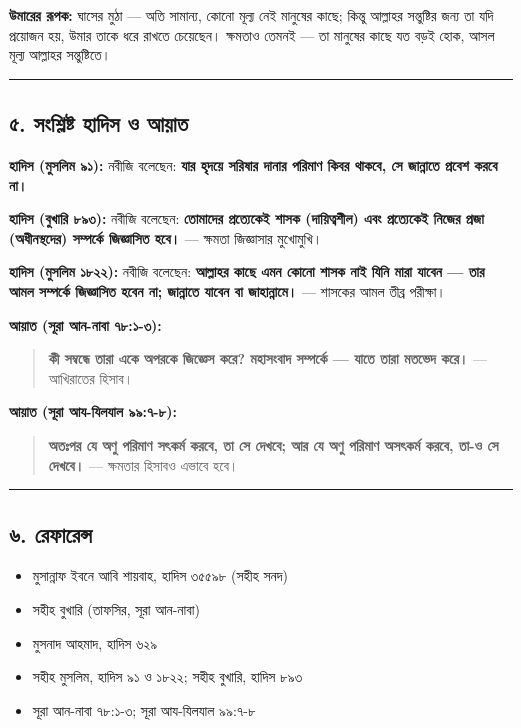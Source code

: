 \textbf{উমারের রূপক:} ঘাসের মুঠা — অতি সামান্য, কোনো মূল্য নেই মানুষের কাছে; কিন্তু আল্লাহর সন্তুষ্টির জন্য তা যদি প্রয়োজন হয়, উমার তাকে ধরে রাখতে চেয়েছেন। ক্ষমতাও তেমনই — তা মানুষের কাছে যত বড়ই হোক, আসল মূল্য আল্লাহর সন্তুষ্টিতে।

\medskip\hrule\medskip

\subsection*{৫. সংশ্লিষ্ট হাদিস ও আয়াত}

\textbf{হাদিস (মুসলিম ৯১):} নবীজি বলেছেন: \textbf{যার হৃদয়ে সরিষার দানার পরিমাণ কিবর থাকবে, সে জান্নাতে প্রবেশ করবে না।}

\textbf{হাদিস (বুখারি ৮৯৩):} নবীজি বলেছেন: \textbf{তোমাদের প্রত্যেকেই শাসক (দায়িত্বশীল) এবং প্রত্যেকেই নিজের প্রজা (অধীনস্থদের) সম্পর্কে জিজ্ঞাসিত হবে।} — ক্ষমতা জিজ্ঞাসার মুখোমুখি।

\textbf{হাদিস (মুসলিম ১৮২২):} নবীজি বলেছেন: \textbf{আল্লাহর কাছে এমন কোনো শাসক নাই যিনি মারা যাবেন — তার আমল সম্পর্কে জিজ্ঞাসিত হবেন না; জান্নাতে যাবেন বা জাহান্নামে।} — শাসকের আমল তীব্র পরীক্ষা।

\textbf{আয়াত (সূরা আন-নাবা ৭৮:১-৩):}
\begin{quote}
\textbf{কী সম্বন্ধে তারা একে অপরকে জিজ্ঞেস করে? মহাসংবাদ সম্পর্কে — যাতে তারা মতভেদ করে।} — আখিরাতের হিসাব।
\end{quote}

\textbf{আয়াত (সূরা আয-যিলযাল ৯৯:৭-৮):}
\begin{quote}
\textbf{অতঃপর যে অণু পরিমাণ সৎকর্ম করবে, তা সে দেখবে; আর যে অণু পরিমাণ অসৎকর্ম করবে, তা-ও সে দেখবে।} — ক্ষমতার হিসাবও এভাবে হবে।
\end{quote}

\medskip\hrule\medskip

\subsection*{৬. রেফারেন্স}

\begin{itemize}
\item মুসান্নাফ ইবনে আবি শায়বাহ, হাদিস ৩৫৫৯৮ (সহীহ সনদ)
\item সহীহ বুখারি (তাফসির, সূরা আন-নাবা)
\item মুসনাদ আহমাদ, হাদিস ৬২৯
\item সহীহ মুসলিম, হাদিস ৯১ ও ১৮২২; সহীহ বুখারি, হাদিস ৮৯৩
\item সূরা আন-নাবা ৭৮:১-৩; সূরা আয-যিলযাল ৯৯:৭-৮
\end{itemize}


